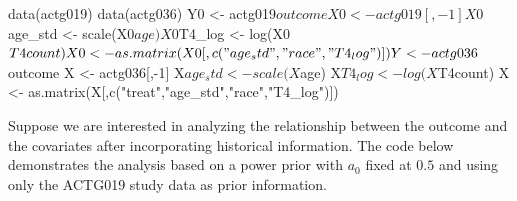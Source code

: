 \begin{example}
data(actg019)
data(actg036)
Y0 <- actg019$outcome
X0 <- actg019[,-1]
X0$age_std <- scale(X0$age)
X0$T4_log <- log(X0$T4count)
X0 <- as.matrix(X0[,c("age_std","race","T4_log")])

Y <- actg036$outcome
X <- actg036[,-1]
X$age_std <- scale(X$age)
X$T4_log <- log(X$T4count)
X <- as.matrix(X[,c("treat","age_std","race","T4_log")])
\end{example}

Suppose we are interested in analyzing the relationship between the outcome and the covariates after incorporating historical information. The code below demonstrates the analysis based on a power prior with $a_0$ fixed at $0.5$ and using only the ACTG019 study data as prior information. 


